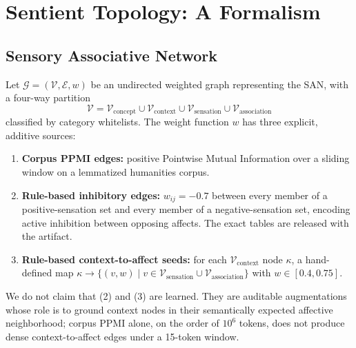 \documentclass{article}
\begin{document}
\section{Sentient Topology: A Formalism}

\subsection{Sensory Associative Network}
Let $\mathcal{G} = (\mathcal{V}, \mathcal{E}, w)$ be an undirected weighted
graph representing the SAN, with a four-way partition
\begin{equation}
    \mathcal{V} = \mathcal{V}_{\text{concept}} \cup \mathcal{V}_{\text{context}}
    \cup \mathcal{V}_{\text{sensation}} \cup \mathcal{V}_{\text{association}}
\end{equation}
classified by category whitelists. The weight function $w$ has three
explicit, additive sources:
\begin{enumerate}
    \item \textbf{Corpus PPMI edges:} positive Pointwise Mutual Information
      over a sliding window on a lemmatized humanities corpus.
    \item \textbf{Rule-based inhibitory edges:} $w_{ij} = -0.7$ between every
      member of a positive-sensation set and every member of a
      negative-sensation set, encoding active inhibition between opposing
      affects. The exact tables are released with the artifact.
    \item \textbf{Rule-based context-to-affect seeds:} for each
      $\mathcal{V}_{\text{context}}$ node $\kappa$, a hand-defined map
      $\kappa \to \{(v, w) \mid v \in \mathcal{V}_{\text{sensation}} \cup
      \mathcal{V}_{\text{association}}\}$ with $w \in [0.4, 0.75]$.
\end{enumerate}
We do not claim that (2) and (3) are learned. They are auditable
augmentations whose role is to ground context nodes in their semantically
expected affective neighborhood; corpus PPMI alone, on the order of $10^6$
tokens, does not produce dense context-to-affect edges under a 15-token
window.
\end{document}
